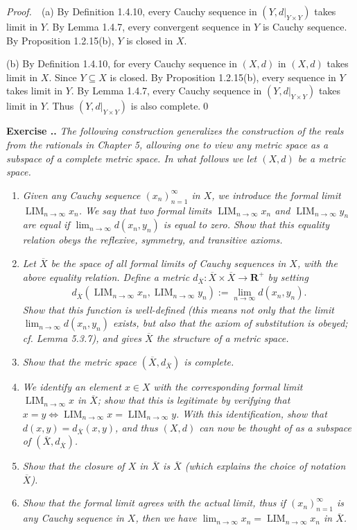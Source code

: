 \documentclass{book}
\DeclareMathOperator{\tlim}{LIM}%
\newcommand{\pff}{\vspace{.25em}\noindent\emph{Proof.}~~}
\newcounter{Exercise}[section]
\renewcommand{\theExercise}{\thesection.\arabic{Exercise}.}
\newcommand{\new}{\vspace{1.5em}\noindent\textbf{Exercise \stepcounter{Exercise}\textbf{\theExercise}} }
\begin{document}
\pff (a) By Definition 1.4.10, every Cauchy sequence in $(Y,d|_{Y\times Y})$ takes limit in $Y$. By Lemma 1.4.7, every convergent sequence in $Y$ is Cauchy sequence. By Proposition 1.2.15(b), $Y$ is closed in $X$.

(b) By Definition 1.4.10, for every Cauchy sequence in $(X,d)$ in $(X,d)$ takes limit in $X$. Since $Y\subseteq X$ is closed. By Proposition 1.2.15(b), every sequence in $Y$ takes limit in $Y$. By Lemma 1.4.7, every Cauchy sequence in $(Y,d|_{Y\times Y})$ takes limit in $Y$. Thus $(Y,d|_{Y\times Y})$ is also complete.\qed

\new\emph{The following construction generalizes the construction of the reals from the rationals in Chapter 5, allowing one to view any metric space as a subspace of a complete metric space. In what follows we let $(X,d)$ be a metric space.}
\begin{enumerate}
    \item \emph{Given any Cauchy sequence $(x_n)_{n=1}^{\infty}$ in $X$, we introduce the \textnormal{formal limit} $\tlim_{n\to\infty}x_n$. We say that two formal limits $\tlim_{n\to\infty}x_n$ and $\tlim_{n\to\infty}y_n$ are equal if $\lim_{n\to\infty}d(x_n,y_n)$ is equal to zero. Show that this equality relation obeys the reflexive, symmetry, and transitive axioms.}
    \item \emph{Let $\overline X$ be the space of all formal limits of Cauchy sequences in $X$, with the above equality relation. Define a metric $d_{\overline X}:\overline X\times\overline X\to\mathbf{R}^+$ by setting}
        \begin{align*}
            d_{\overline X}(\tlim_{n\to\infty}x_n,\tlim_{n\to\infty}y_n):=\lim_{n\to\infty}d(x_n,y_n).
        \end{align*}
    \emph{Show that this function is well-defined (this means not only that the limit $\lim_{n\to\infty}d(x_n,y_n)$ exists, but also that the axiom of substitution is obeyed; cf. Lemma 5.3.7), and gives $\overline X$ the structure of a metric space.}
    \item \emph{Show that the metric space $(\overline X,d_{\overline X})$ is complete.}
    \item \emph{We identify an element $x\in X$ with the corresponding formal limit $\tlim_{n\to\infty}x$ in $\overline X$; show that this is legitimate by verifying that $x=y\iff\tlim_{n\to\infty}x=\tlim_{n\to\infty}y$. With this identification, show that $d(x,y)=d_{\overline X}(x,y)$, and thus $(X,d)$ can now be thought of as a subspace of $(\overline X,d_{\overline X})$.}
    \item \emph{Show that the closure of $X$ in $\overline X$ is $\overline X$ (which explains the choice of notation $\overline X$).}
    \item \emph{Show that the formal limit agrees with the actual limit, thus if $(x_n)_{n=1}^{\infty}$ is any Cauchy sequence in $X$, then we have $\lim_{n\to\infty}x_n=\tlim_{n\to\infty}x_n$ in $\overline X$.}
\end{enumerate}
\end{document}
